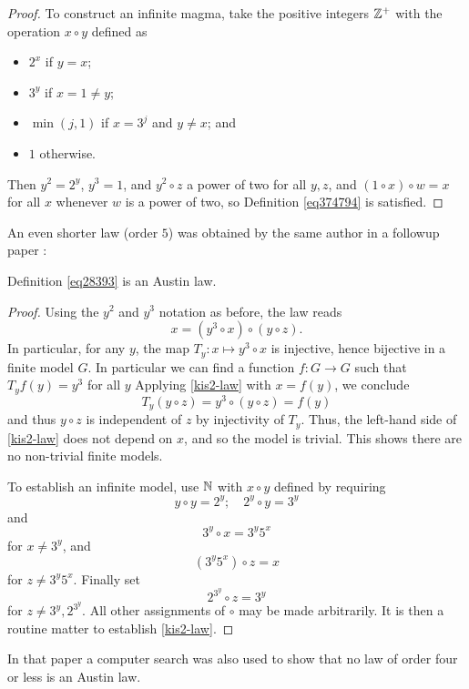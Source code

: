 \begin{definition}[Equation 953]
\begin{proof}
To construct an infinite magma, take the positive integers $\mathbb{Z}^+$ with the operation $x \circ y$ defined as
\begin{itemize}
  \item $2^x$ if $y=x$;
  \item $3^y$ if $x = 1 \neq y$;
  \item $\min(j,1)$ if $x=3^j$ and $y \neq x$; and
  \item $1$ otherwise.
\end{itemize}
Then $y^2 = 2^y$, $y^3 = 1$, and $y^2 \circ z$ a power of two for all $y, z$, and $(1 \circ x) \circ w = x$ for all $x$ whenever $w$ is a power of two, so Definition \ref{eq374794} is satisfied.
\end{proof}

An even shorter law (order $5$) was obtained by the same author in a followup paper \cite{Kisielewicz2}:

\begin{theorem}\label{kis-thm2} Definition \ref{eq28393} is an Austin law.
\end{theorem}

\begin{proof} Using the $y^2$ and $y^3$ notation as before, the law reads
\begin{equation}\label{kis2-law}
   x = (y^3 \circ x) \circ (y \circ z).
  \end{equation}
In particular, for any $y$, the map $T_y \colon x \mapsto y^3 \circ x$ is injective, hence bijective in a finite model $G$.  In particular we can find a function $f : G \to G$ such that $T_y f(y) = y^3$ for all $y$  Applying \eqref{kis2-law} with $x = f(y)$, we conclude
$$ T_y(y \circ z) = y^3 \circ (y \circ z) = f(y) $$
and thus $y \circ z$ is independent of $z$ by injectivity of $T_y$.  Thus, the left-hand side of \eqref{kis2-law} does not depend on $x$, and so the model is trivial.  This shows there are no non-trivial finite models.

To establish an infinite model, use $\mathbb{N}$ with $x \circ y$ defined by requiring
$$ y \circ y = 2^y; \quad 2^y \circ y = 3^y$$
and
$$ 3^y \circ x = 3^y 5^x$$
for $x \neq 3^y$, and
$$ (3^y 5^x) \circ z = x$$
for $z \neq 3^y 5^x$.  Finally set
$$ 2^{3^y} \circ z = 3^y$$
for $z \neq 3^y, 2^{3^y}$.  All other assignments of $\circ$ may be made arbitrarily. It is then a routine matter to establish \eqref{kis2-law}.
\end{proof}

In that paper a computer search was also used to show that no law of order four or less is an Austin law.


\end{definition}
